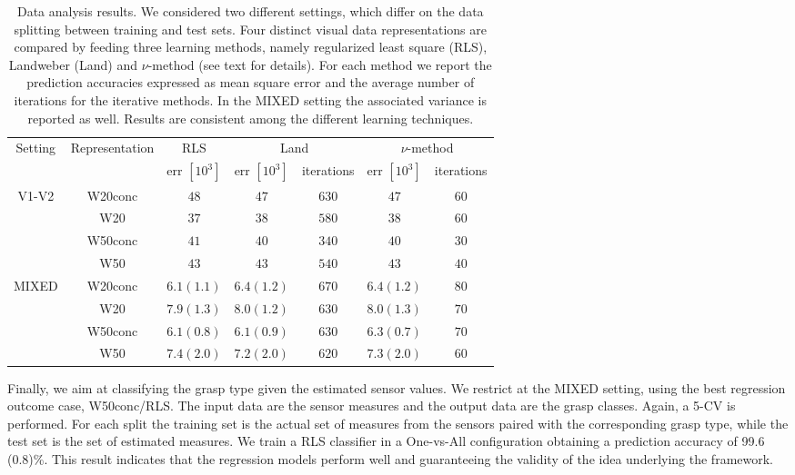 \begin{table}[h!]
\centering

\begin{tabular}{|c|c|c|c|c|c|c|}
\hline 
\multirow{2}{*}{Setting} & \multirow{2}{*}{Representation}  & RLS  & \multicolumn{2}{c|}{Land}  & \multicolumn{2}{c|}{$\nu$-method}  \\\cline{4-7}
 & & err $ [10^3]$ &err $ [10^3]$ & iterations& err $ [10^3]$ &iterations\\\hline
\multirow{4}{*}{V1-V2} & W20conc  & $48$ & $47$& $630$ & $47$&$60$\\\cline{2-7}
&W20  	  & $37$ & $38$& $580$ &$38$&$60$\\\cline{2-7}
&W50conc & $41$ & $40$&  $340$&$40$&$30$\\\cline{2-7}
&W50 	  & $43$ & $43$&  $540$ &$43$&$40$\\\hline
\multirow{4}{*}{MIXED} 
& W20conc & $6.1 (1.1) $ & $6.4 (1.2) $& $670$ &$6.4 (1.2) $&$80$\\\cline{2-7}
& W20 & $7.9 (1.3) $ & $8.0 (1.2) $& $630$ &$8.0 (1.3) $&$70$\\\cline{2-7}
&  W50conc &   $6.1 (0.8) $ & $6.1 (0.9) $& $630$ & $6.3 (0.7) $&$70$\\\cline{2-7}
& W50 & $7.4 (2.0) $ & $7.2 (2.0) $& $620$ &$7.3 (2.0) $&$60$\\\hline
\end{tabular}
\caption{Data analysis results. 
We considered two different settings, which differ on the data splitting between training and test sets. 
Four distinct visual data representations are compared by feeding three learning methods, namely regularized least square (RLS), Landweber (Land) and $\nu$-method (see text for details). 
For each method we report the prediction accuracies expressed as mean square error and the average number of iterations for the iterative methods. 
In the MIXED setting the associated variance is reported as well. Results are consistent among the different learning techniques. }
\label{tab:results}
\end{table}
Finally, we aim at classifying the grasp type given the estimated sensor values.
We restrict at the MIXED setting, using the best regression outcome case,  W50conc/RLS.
The input data are the sensor measures and the output data are the grasp classes.
Again, a 5-CV is performed. For each split the training set is the actual set of measures from the sensors paired with the corresponding
grasp type, while the test set is the set of estimated measures.  
We train a RLS classifier \cite{rifkin03rlsc} in a One-vs-All configuration 
 obtaining a prediction accuracy of 99.6 (0.8)\%. 
 This result indicates that the regression models perform well and 
 guaranteeing the validity of the idea underlying the framework.









